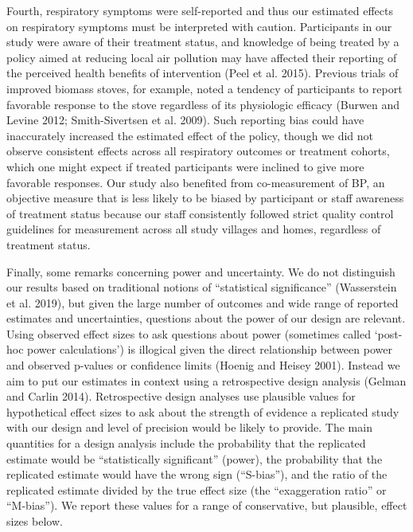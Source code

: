 \documentclass[
  letterpaper,
  DIV=11,
  numbers=noendperiod]{scrartcl}
\begin{document}
Fourth, respiratory symptoms were self-reported and thus our estimated
effects on respiratory symptoms must be interpreted with caution.
Participants in our study were aware of their treatment status, and
knowledge of being treated by a policy aimed at reducing local air
pollution may have affected their reporting of the perceived health
benefits of intervention (Peel et al. 2015). Previous trials of improved
biomass stoves, for example, noted a tendency of participants to report
favorable response to the stove regardless of its physiologic efficacy
(Burwen and Levine 2012; Smith-Sivertsen et al. 2009). Such reporting
bias could have inaccurately increased the estimated effect of the
policy, though we did not observe consistent effects across all
respiratory outcomes or treatment cohorts, which one might expect if
treated participants were inclined to give more favorable responses. Our
study also benefited from co-measurement of BP, an objective measure
that is less likely to be biased by participant or staff awareness of
treatment status because our staff consistently followed strict quality
control guidelines for measurement across all study villages and homes,
regardless of treatment status.

Finally, some remarks concerning power and uncertainty. We
do not distinguish our results based on traditional notions of
``statistical significance'' (Wasserstein et al. 2019), but given the
large number of outcomes and wide range of reported estimates and
uncertainties, questions about the power of our design are relevant.
Using observed effect sizes to ask questions about power (sometimes
called `post-hoc power calculations') is illogical given the direct
relationship between power and observed p-values or confidence limits
(Hoenig and Heisey 2001). Instead we aim to put our estimates in context
using a retrospective design analysis (Gelman and Carlin 2014).
Retrospective design analyses use plausible values for hypothetical
effect sizes to ask about the strength of evidence a replicated study
with our design and level of precision would be likely to provide. The
main quantities for a design analysis include the probability that the
replicated estimate would be ``statistically significant'' (power), the
probability that the replicated estimate would have the wrong sign
(``S-bias''), and the ratio of the replicated estimate divided by the
true effect size (the ``exaggeration ratio'' or ``M-bias''). We report
these values for a range of conservative, but plausible, effect sizes
below.
\end{document}
